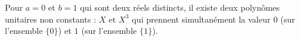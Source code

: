 Pour $a = 0$ et $b = 1$ qui sont deux réels distincts, il existe deux polynômes unitaires non constants : $X$ et $X^3$ qui prennent simultanément la valeur $0$ (sur l'ensemble $\{0\}$) et $1$ (sur l'ensemble $\{1\}$).
